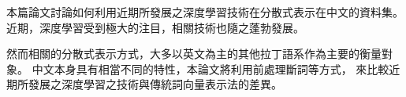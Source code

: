 \begin{abstractCH}

本篇論文討論如何利用近期所發展之深度學習技術在分散式表示在中文的資料集。 近期，深度學習受到極大的注目，相關技術也隨之蓬勃發展。

然而相關的分散式表示方式，大多以英文為主的其他拉丁語系作為主要的衡量對象。 中文本身具有相當不同的特性，本論文將利用前處理斷詞等方式，
來比較近期所發展之深度學習之技術與傳統詞向量表示法的差異。

\end{abstractCH}


